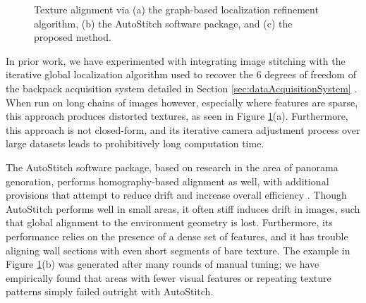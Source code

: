 \documentclass[]{spie}  %
\begin{document}
\begin{figure}
  \centering {}

  \centering {}

  \centering {}

  \caption{Texture alignment via (a) the graph-based localization
    refinement algorithm, (b) the AutoStitch software package, and (c)
    the proposed method.}
  \label{fig:mosaic3D}
\end{figure}


In prior work, we have experimented with integrating image stitching
with the iterative global localization algorithm used to recover the 6
degrees of freedom of the backpack acquisition system detailed in
Section \ref{sec:dataAcquisitionSystem} \cite{liu2010indoor}. When run
on long chains of images however, especially where features are
sparse, this approach produces distorted textures, as seen in Figure
\ref{fig:mosaic3D}(a). Furthermore, this approach is not closed-form,
and its iterative camera adjustment process over large datasets leads
to prohibitively long computation time.

The AutoStitch software package, based on research in the area of
panorama genoration, performs homography-based alignment as well, with
additional provisions that attempt to reduce drift and increase
overall efficiency \cite{panorama2d, autostitch}. Though AutoStitch
performs well in small areas, it often stiff induces drift in images,
such that global alignment to the environment geometry is
lost. Furthermore, its performance relies on the presence of a dense
set of features, and it has trouble aligning wall sections with even
short segments of bare texture. The example in Figure
\ref{fig:mosaic3D}(b) was generated after many rounds of manual
tuning; we have empirically found that areas with fewer visual
features or repeating texture patterns simply failed outright with
AutoStitch.
\end{document}
